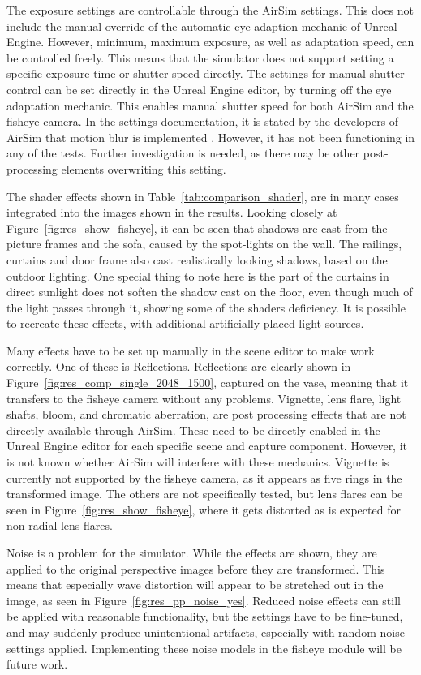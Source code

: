 The exposure settings are controllable through the AirSim settings. This does not include the manual override of the automatic eye adaption mechanic of Unreal Engine. However, minimum, maximum exposure, as well as adaptation speed, can be controlled freely. This means that the simulator does not support setting a specific exposure time or shutter speed directly. The settings for manual shutter control can be set directly in the Unreal Engine editor, by turning off the eye adaptation mechanic. This enables manual shutter speed for both AirSim and the fisheye camera. In the settings documentation, it is stated by the developers of AirSim that motion blur is implemented \cite{AirSimSettings}. However, it has not been functioning in any of the tests. Further investigation is needed, as there may be other post-processing elements overwriting this setting.

The shader effects shown in Table~\ref{tab:comparison_shader}, are in many cases integrated into the images shown in the results. Looking closely at Figure~\ref{fig:res_show_fisheye}, it can be seen that shadows are cast from the picture frames and the sofa, caused by the spot-lights on the wall. The railings, curtains and door frame also cast realistically looking shadows, based on the outdoor lighting. One special thing to note here is the part of the curtains in direct sunlight does not soften the shadow cast on the floor, even though much of the light passes through it, showing some of the shaders deficiency. It is possible to recreate these effects, with additional artificially placed light sources.

Many effects have to be set up manually in the scene editor to make work correctly. One of these is Reflections. Reflections are clearly shown in Figure~\ref{fig:res_comp_single_2048_1500}, captured on the vase, meaning that it transfers to the fisheye camera without any problems. Vignette, lens flare, light shafts, bloom, and chromatic aberration, are post processing effects that are not directly available through AirSim. These need to be directly enabled in the Unreal Engine editor for each specific scene and capture component. However, it is not known whether AirSim will interfere with these mechanics. Vignette is currently not supported by the fisheye camera, as it appears as five rings in the transformed image. The others are not specifically tested, but lens flares can be seen in Figure~\ref{fig:res_show_fisheye}, where it gets distorted as is expected for non-radial lens flares.

Noise is a problem for the simulator. While the effects are shown, they are applied to the original perspective images before they are transformed. This means that especially wave distortion will appear to be stretched out in the image, as seen in Figure~\ref{fig:res_pp_noise_yes}. Reduced noise effects can still be applied with reasonable functionality, but the settings have to be fine-tuned, and may suddenly produce unintentional artifacts, especially with random noise settings applied. Implementing these noise models in the fisheye module will be future work.

